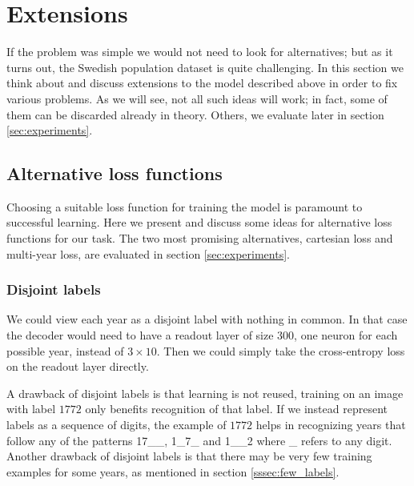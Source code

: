 \section{Extensions}

If the problem was simple we would not need to look for alternatives; but as it turns out, the Swedish population dataset is quite challenging.
In this section we think about and discuss extensions to the model described above in order to fix various problems.
As we will see, not all such ideas will work; in fact, some of them can be discarded already in theory. Others, we evaluate later in section \ref{sec:experiments}.


\subsection{Alternative loss functions} \label{ssec:alt_loss}

Choosing a suitable loss function for training the model is paramount to successful learning.
Here we present and discuss some ideas for alternative loss functions for our task.
The two most promising alternatives, cartesian loss and multi-year loss, are evaluated in section \ref{sec:experiments}.


\subsubsection{Disjoint labels}


We could view each year as a disjoint label with nothing in common. In that case the decoder would need to have a readout layer of size $300$, one neuron for each possible year, instead of $3 \times 10$. Then we could simply take the cross-entropy loss on the readout layer directly.

A drawback of disjoint labels is that learning is not reused, training on an image with label $1772$ only benefits recognition of that label.
If we instead represent labels as a sequence of digits, the example of $1772$ helps in recognizing years that follow any of the patterns 17\_\_, 1\_7\_ and 1\_\_2 where \_ refers to any digit.
Another drawback of disjoint labels is that there may be very few training examples for some years, as mentioned in section \ref{sssec:few_labels}.

